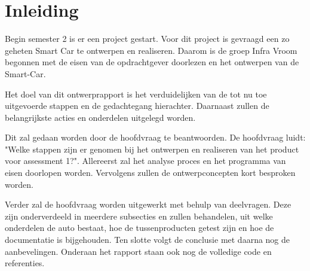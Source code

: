 \section{Inleiding}
Begin semester 2 is er een project gestart. Voor dit project is gevraagd een zo geheten Smart Car te ontwerpen en realiseren. Daarom is de groep Infra Vroom begonnen met de eisen van de opdrachtgever doorlezen en het ontwerpen van de \gls{Smart-Car}. 

Het doel van dit ontwerprapport is het verduidelijken van de tot nu toe uitgevoerde stappen en de gedachtegang hierachter. Daarnaast zullen de belangrijkste acties en onderdelen uitgelegd worden. 

Dit zal gedaan worden door de hoofdvraag te beantwoorden. De hoofdvraag luidt: "Welke stappen zijn er genomen bij het ontwerpen en realiseren van het product voor assessment 1?". Allereerst zal het analyse proces en het programma van eisen doorlopen worden. Vervolgens zullen de ontwerpconcepten kort besproken worden. 

 Verder zal de hoofdvraag worden uitgewerkt met behulp van deelvragen. Deze zijn onderverdeeld in meerdere subsecties en zullen behandelen, uit welke onderdelen de auto bestaat, hoe de tussenproducten getest zijn en hoe de documentatie is bijgehouden. Ten slotte volgt de conclusie met daarna nog de aanbevelingen. Onderaan het rapport staan ook nog de volledige code en referenties.  
